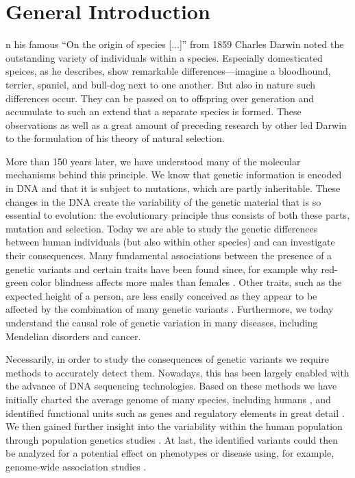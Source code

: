 \chapter{General Introduction}
\label{sec:intro}

n his famous ``On the origin of species [...]'' from 1859 Charles Darwin noted
the outstanding variety of individuals within a species. Especially domesticated
speices, as he describes, show remarkable differences---imagine a bloodhound,
terrier, spaniel, and bull-dog next to one another. But also in nature such
differences occur. They can be passed on to offspring over generation and
accumulate to such an extend that a separate species is formed. These
observations as well as a great amount of preceding research by other led
Darwin to the formulation of his theory of natural selection.

More than 150 years later, we have understood many of the molecular mechanisms
behind this principle. We know that genetic information is encoded in DNA and
that it is subject to mutations, which are partly inheritable. These changes in
the DNA create the variability of the genetic material that is so essential to
evolution: the evolutionary principle thus consists of both these parts,
mutation and selection. Today we are able to study the genetic differences
between human individuals (but also within other species) and can investigate
their consequences. Many fundamental associations between the presence of a
genetic variants and certain traits have been found since, for example why
red-green color blindness affects more males than females \citep{Nathans1986}.
Other traits, such as the expected height of a person, are less easily conceived
as they appear to be affected by the combination of many genetic variants
\citep{Wood2014,Marouli2017}. Furthermore, we today understand the causal role
of genetic variation in many diseases, including Mendelian disorders and cancer.    

Necessarily, in order to study the consequences of genetic variants we require
methods to accurately detect them. Nowadays, this has been largely enabled with
the advance of DNA sequencing technologies. Based on these methods we have
initially charted the average genome of many species, including humans
\citep{Lander2001,Venter2001}, and identified functional units such as genes and
regulatory elements in great detail \citep{Dunham2012}. We then gained further
insight into the variability within the human population through population
genetics studies \citep{Auton2015,Sudmant2015}. At last, the identified variants
could then be analyzed for a potential effect on phenotypes or disease using,
for example, genome-wide association studies \citep{Ott2015,MacArthur2017}.

